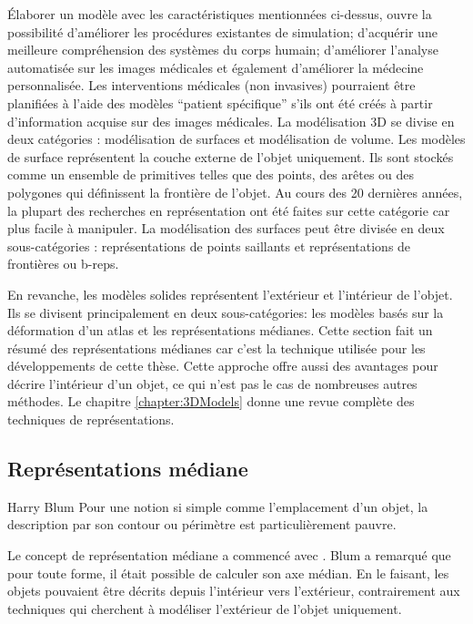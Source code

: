 Élaborer un modèle avec les caractéristiques mentionnées ci-dessus, ouvre la possibilité d'améliorer les procédures existantes de simulation; d'acquérir une meilleure compréhension des systèmes du corps humain; d'améliorer l'analyse automatisée sur les images médicales et également d'améliorer la médecine personnalisée.
Les interventions médicales (non invasives) pourraient être planifiées à l'aide des modèles ``patient spécifique'' s'ils ont été créés à partir d'information acquise sur des images médicales.
La modélisation 3D se divise en deux catégories : modélisation de surfaces et modélisation de volume.
Les modèles de surface représentent la couche externe de l'objet uniquement. 
Ils sont stockés comme un ensemble de primitives telles que des points, des arêtes ou des polygones qui définissent la frontière de l'objet.
Au cours des 20 dernières années, la plupart des recherches en représentation ont été faites sur cette catégorie car  plus facile à manipuler.
La modélisation des surfaces peut être divisée en deux sous-catégories : représentations de points saillants et représentations de frontières ou b-reps.

En revanche, les modèles solides représentent l'extérieur et l'intérieur de l'objet.
Ils se divisent principalement en deux sous-catégories: les modèles basés sur la déformation d'un atlas et les représentations médianes.
Cette section fait un résumé des représentations médianes car c'est la technique utilisée pour les développements de cette thèse. 
Cette approche offre aussi des avantages pour décrire l'intérieur d'un objet,  ce qui n'est pas le cas de nombreuses autres méthodes.
Le chapitre \ref{chapter:3DModels} donne une revue complète des techniques de représentations.

\subsection{Représentations médiane}
\label{sec:quasiMedialfr}

\begin{chapquote}{Harry Blum}
Pour une notion si simple comme l'emplacement d'un objet, la description par son contour ou périmètre est particulièrement pauvre.
\end{chapquote}

Le concept de représentation médiane a commencé avec \cite{blum1967transformation}.
Blum a remarqué que pour toute forme, il était possible de calculer son axe médian. 
En le faisant, les objets pouvaient être décrits depuis l'intérieur vers l'extérieur, contrairement  aux techniques qui cherchent à modéliser l'extérieur de l'objet uniquement.

